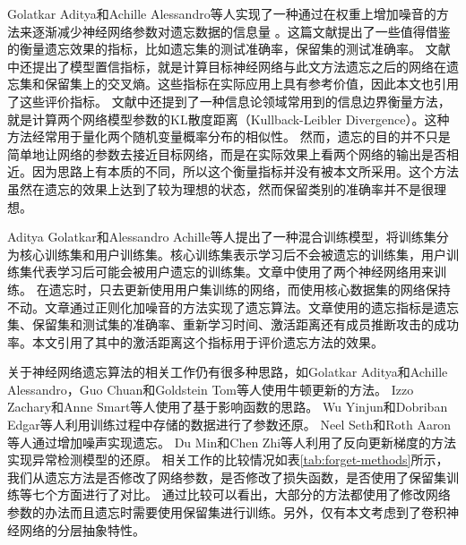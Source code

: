 Golatkar Aditya和Achille Alessandro等人\cite{Golatkar_2020_CVPR}实现了一种通过在权重上增加噪音的方法来逐渐减少神经网络参数对遗忘数据的信息量
。这篇文献提出了一些值得借鉴的衡量遗忘效果的指标，比如遗忘集的测试准确率，保留集的测试准确率。
文献中还提出了模型置信指标，就是计算目标神经网络与此文方法遗忘之后的网络在遗忘集和保留集上的交叉熵。这些指标在实际应用上具有参考价值，因此本文也引用了这些评价指标。
文献中还提到了一种信息论领域常用到的信息边界衡量方法，就是计算两个网络模型参数的KL散度距离（Kullback-Leibler Divergence）。这种方法经常用于量化两个随机变量概率分布的相似性。
然而，遗忘的目的并不只是简单地让网络的参数去接近目标网络，而是在实际效果上看两个网络的输出是否相近。因为思路上有本质的不同，所以这个衡量指标并没有被本文所采用。这个方法虽然在遗忘的效果上达到了较为理想的状态，然而保留类别的准确率并不是很理想。

Aditya Golatkar和Alessandro Achille\cite{Golatkar_2021_CVPR}等人提出了一种混合训练模型，将训练集分为核心训练集和用户训练集。核心训练集表示学习后不会被遗忘的训练集，用户训练集代表学习后可能会被用户遗忘的训练集。文章中使用了两个神经网络用来训练。
在遗忘时，只去更新使用用户集训练的网络，而使用核心数据集的网络保持不动。文章通过正则化加噪音的方法实现了遗忘算法。文章使用的遗忘指标是遗忘集、保留集和测试集的准确率、重新学习时间、激活距离还有成员推断攻击的成功率。本文引用了其中的激活距离这个指标用于评价遗忘方法的效果。

关于神经网络遗忘算法的相关工作仍有很多种思路，如Golatkar Aditya和Achille Alessandro，Guo Chuan和Goldstein Tom等人\cite{10.1007/978-3-030-58526-6_23,pmlr-v119-guo20c}使用牛顿更新的方法。
Izzo Zachary和Anne Smart等人\cite{pmlr-v130-izzo21a}使用了基于影响函数\cite{pmlr-v70-koh17a,cook_weisberg_1982}的思路。
Wu Yinjun和Dobriban Edgar等人\cite{pmlr-v119-wu20b}利用训练过程中存储的数据进行了参数还原。
Neel Seth和Roth Aaron等人\cite{pmlr-v132-neel21a}通过增加噪声实现遗忘。
Du Min和Chen Zhi等人\cite{10.1145/3319535.3363226}利用了反向更新梯度的方法实现异常检测模型的还原。
相关工作的比较情况如表\ref{tab:forget-methods}所示，我们从遗忘方法是否修改了网络参数，是否修改了损失函数，是否使用了保留集训练等七个方面进行了对比。
通过比较可以看出，大部分的方法都使用了修改网络参数的办法而且遗忘时需要使用保留集进行训练。另外，仅有本文考虑到了卷积神经网络的分层抽象特性。

